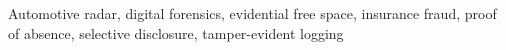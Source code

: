 Automotive radar, digital forensics, evidential free space, insurance fraud, proof of absence, selective disclosure, tamper-evident logging
